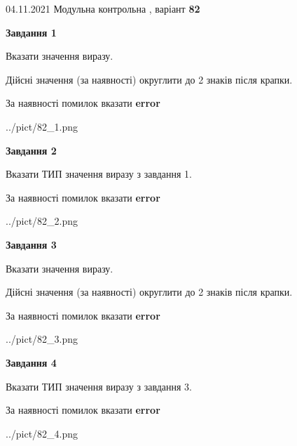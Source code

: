 \documentclass[11pt, ukrainian]{article}
\begin{document}
{04.11.2021 Модульна контрольна , варіант  \No \textbf { 82 }\par}
{
\begin {large}
{\begin {center}\textbf{Завдання 1}\end {center}}\par
Вказати значення виразу. \par
Дійсні значення (за наявності) округлити до 2 знаків після крапки. \par
За наявності помилок вказати \textbf{error}

\begin{center}
	{../pict/82_1.png}
\end{center}
\newpage

{\begin {center}\textbf{Завдання 2}\end {center}}\par
Вказати ТИП значення виразу з завдання 1. \par
За наявності помилок вказати \textbf{error}

\begin{center}
	{../pict/82_2.png}
\end{center}
\newpage

{\begin {center}\textbf{Завдання 3}\end {center}}\par
Вказати значення виразу. \par
Дійсні значення (за наявності) округлити до 2 знаків після крапки. \par
За наявності помилок вказати \textbf{error}

\begin{center}
	{../pict/82_3.png}
\end{center}
\newpage

{\begin {center}\textbf{Завдання 4}\end {center}}\par
Вказати ТИП значення виразу з завдання 3. \par
За наявності помилок вказати \textbf{error}

\begin{center}
	{../pict/82_4.png}
\end{center}
\newpage


\end{large}}
\end{document}
